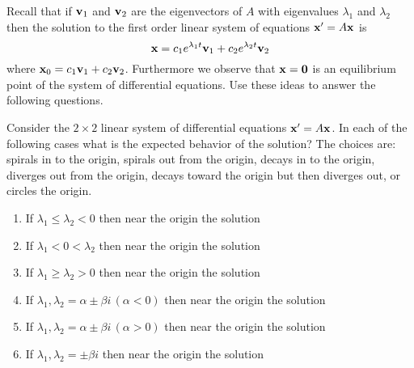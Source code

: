 Recall that if ${\bf v}_1$ and ${\bf v}_2$ are the eigenvectors of $A$ with eigenvalues
$\lambda_1$ and $\lambda_2$ then the solution to the first order linear system of
equations ${\bf x}' = A {\bf x}$ is
\[ {\bf x} = c_1 e^{\lambda_1 t} {\bf v}_1 + c_2 e^{\lambda_2 t} {\bf v}_2 \]
where ${\bf x}_0 = c_1 {\bf v}_1 + c_2 {\bf v}_2$.  Furthermore we observe that ${\bf x} = {\bf 0}$ is an
equilibrium point of the system of differential equations.  Use these ideas to answer the
following questions.
\begin{problem}
    Consider the $2\times 2$ linear system of differential equations ${\bf x}'=A{\bf x}$.  In each
    of the following cases what is the expected behavior of the solution? The choices are:
    spirals in to the origin, spirals out from the origin, decays in to the origin,
    diverges out from the origin, decays toward the origin but then diverges out, or
    circles the origin.
            \begin{enumerate}
                \item If $\lambda_1 \le \lambda_2 < 0$ then near the origin the
                    solution \underline{\hspace{1in}}
                \item If $\lambda_1 < 0 < \lambda_2$ then near the origin the
                    solution \underline{\hspace{1in}}
                \item If $\lambda_1 \ge \lambda_2 > 0$ then near the origin the
                    solution \underline{\hspace{1in}}
                \item If $\lambda_1, \lambda_2 = \alpha \pm \beta i \, (\alpha<0)$ then
                    near the origin the solution \underline{\hspace{1in}}
                \item If $\lambda_1, \lambda_2 = \alpha \pm \beta i \, (\alpha>0)$ then
                    near the origin the solution \underline{\hspace{1in}}
                \item If $\lambda_1, \lambda_2 = \pm \beta i$ then near the origin
                    the solution \underline{\hspace{1in}}
            \end{enumerate}
\end{problem}

